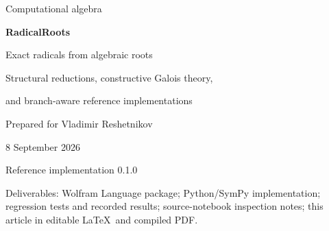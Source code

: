 \documentclass[11pt,letterpaper]{article}
\newcommand{\Q}{\mathbb Q}\newcommand{\C}{\mathbb C}
\newcommand{\code}[1]{\texttt{#1}}
\theoremstyle{definition}\newtheorem{definition}[theorem]{Definition}
\theoremstyle{remark}\newtheorem{remark}[theorem]{Remark}
\begin{document}
\begin{titlepage}
\vspace*{1.0cm}
{\Large Computational algebra\par}
\vspace{0.8cm}
{\Huge\bfseries RadicalRoots\par}
\vspace{0.45cm}
{\LARGE Exact radicals from algebraic roots\par}
\vspace{0.75cm}
{\large Structural reductions, constructive Galois theory,\par
and branch-aware reference implementations\par}
\vspace{1cm}
Prepared for Vladimir Reshetnikov\par
8 September 2026\par
Reference implementation 0.1.0
\vspace{1.0cm}
\begin{abstract}
An algebraic \code{Root} object specifies both a polynomial equation and a
particular complex root. Producing radicals therefore requires more than
finding a solvable equation: every radical branch must be made consistent
with that embedding. This article develops a two-layer solution. A fast layer
recognizes polynomial composition, powers, generalized reciprocal symmetry
and Dickson polynomials. A general layer constructs an embedded splitting
field, adjoins a carefully chosen cyclotomic field, computes actual
field automorphisms and applies finite Fourier resolvents along a
prime-index normal series. It produces explicit principal-power expressions
with exactly selected root-of-unity corrections.

The unbounded mathematical construction covers every algebraic number over
\(\Q\) that is expressible by radicals. The accompanying software implements
that construction using computer-algebra primitives; it is a reference
implementation, not an unconditional performance or backend-completeness
claim. The Python implementation has executable regression results. The
Wolfram Language implementation and its native tests are supplied but were
not executed because the connected Wolfram service returned HTTP 404.
\end{abstract}
\vfill
\small
Deliverables: Wolfram Language package; Python/SymPy implementation;
regression tests and recorded results; source-notebook inspection notes;
this article in editable \LaTeX\ and compiled PDF.
\end{titlepage}
\begingroup
\small
\setlength{\parskip}{0pt}
\tableofcontents
\endgroup
\newpage
\end{document}
